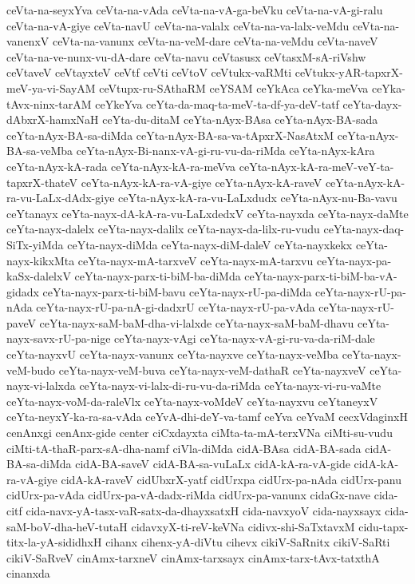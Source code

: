{ceVta-na-seyxYva
ceVta-na-vAda
ceVta-na-vA-ga-beVku
ceVta-na-vA-gi-ralu
ceVta-na-vA-giye
ceVta-navU
ceVta-na-valalx
ceVta-na-va-lalx-veMdu
ceVta-na-vanenxV
ceVta-na-vanunx
ceVta-na-veM-dare
ceVta-na-veMdu
ceVta-naveV
ceVta-na-ve-nunx-vu-dA-dare
ceVta-navu
ceVtasusx
ceVtasxM-sA-riVshw
ceVtaveV
ceVtayxteV
ceVtf
ceVti
ceVtoV
ceVtukx-vaRMti
ceVtukx-yAR-tapxrX-meV-ya-vi-SayAM
ceVtupx-ru-SAthaRM
ceYSAM
ceYkAca
ceYka-meVva
ceYka-tAvx-ninx-tarAM
ceYkeYva
ceYta-da-maq-ta-meV-ta-df-ya-deV-tatf
ceYta-dayx-dAbxrX-hamxNaH
ceYta-du-ditaM
ceYta-nAyx-BAsa
ceYta-nAyx-BA-sada
ceYta-nAyx-BA-sa-diMda
ceYta-nAyx-BA-sa-va-tApxrX-NasAtxM
ceYta-nAyx-BA-sa-veMba
ceYta-nAyx-Bi-nanx-vA-gi-ru-vu-da-riMda
ceYta-nAyx-kAra
ceYta-nAyx-kA-rada
ceYta-nAyx-kA-ra-meVva
ceYta-nAyx-kA-ra-meV-veY-ta-tapxrX-thateV
ceYta-nAyx-kA-ra-vA-giye
ceYta-nAyx-kA-raveV
ceYta-nAyx-kA-ra-vu-LaLx-dAdx-giye
ceYta-nAyx-kA-ra-vu-LaLxdudx
ceYta-nAyx-nu-Ba-vavu
ceYtanayx
ceYta-nayx-dA-kA-ra-vu-LaLxdedxV
ceYta-nayxda
ceYta-nayx-daMte
ceYta-nayx-dalelx
ceYta-nayx-dalilx
ceYta-nayx-da-lilx-ru-vudu
ceYta-nayx-daq-SiTx-yiMda
ceYta-nayx-diMda
ceYta-nayx-diM-daleV
ceYta-nayxkekx
ceYta-nayx-kikxMta
ceYta-nayx-mA-tarxveV
ceYta-nayx-mA-tarxvu
ceYta-nayx-pa-kaSx-dalelxV
ceYta-nayx-parx-ti-biM-ba-diMda
ceYta-nayx-parx-ti-biM-ba-vA-gidadx
ceYta-nayx-parx-ti-biM-bavu
ceYta-nayx-rU-pa-diMda
ceYta-nayx-rU-pa-nAda
ceYta-nayx-rU-pa-nA-gi-dadxrU
ceYta-nayx-rU-pa-vAda
ceYta-nayx-rU-paveV
ceYta-nayx-saM-baM-dha-vi-lalxde
ceYta-nayx-saM-baM-dhavu
ceYta-nayx-savx-rU-pa-nige
ceYta-nayx-vAgi
ceYta-nayx-vA-gi-ru-va-da-riM-dale
ceYta-nayxvU
ceYta-nayx-vanunx
ceYta-nayxve
ceYta-nayx-veMba
ceYta-nayx-veM-budo
ceYta-nayx-veM-buva
ceYta-nayx-veM-dathaR
ceYta-nayxveV
ceYta-nayx-vi-lalxda
ceYta-nayx-vi-lalx-di-ru-vu-da-riMda
ceYta-nayx-vi-ru-vaMte
ceYta-nayx-voM-da-raleVlx
ceYta-nayx-voMdeV
ceYta-nayxvu
ceYtaneyxV
ceYta-neyxY-ka-ra-sa-vAda
ceYvA-dhi-deY-va-tamf
ceYva
ceYvaM
cecxVdaginxH
cenAnxgi
cenAnx-gide
center
ciCxdayxta
ciMta-ta-mA-terxVNa
ciMti-su-vudu
ciMti-tA-thaR-parx-sA-dha-namf
ciVla-diMda
cidA-BAsa
cidA-BA-sada
cidA-BA-sa-diMda
cidA-BA-saveV
cidA-BA-sa-vuLaLx
cidA-kA-ra-vA-gide
cidA-kA-ra-vA-giye
cidA-kA-raveV
cidUbxrX-yatf
cidUrxpa
cidUrx-pa-nAda
cidUrx-panu
cidUrx-pa-vAda
cidUrx-pa-vA-dadx-riMda
cidUrx-pa-vanunx
cidaGx-nave
cida-citf
cida-navx-yA-tasx-vaR-satx-da-dhayxsatxH
cida-navxyoV
cida-nayxsayx
cida-saM-boV-dha-heV-tutaH
cidavxyX-ti-reV-keVNa
cidivx-shi-SaTxtavxM
cidu-tapx-titx-la-yA-sididhxH
cihanx
cihenx-yA-diVtu
cihevx
cikiV-SaRnitx
cikiV-SaRti
cikiV-SaRveV
cinAmx-tarxneV
cinAmx-tarxsayx
cinAmx-tarx-tAvx-tatxthA
cinanxda
}
